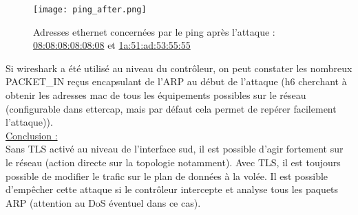\begin{figure}[h]
  	\centering
  	\texttt{[image: ping\_after.png]}
  	\caption{Adresses ethernet concernées par le ping après l'attaque : \url{08:08:08:08:08:08} et \url{1a:51:ad:53:55:55}}
\end{figure}

Si wireshark a été utilisé au niveau du contrôleur, on peut constater les nombreux PACKET\_IN reçus encapsulant de l'ARP au début de l'attaque (h6 cherchant à obtenir les adresses mac de tous les équipements possibles sur le réseau (configurable dans ettercap, mais par défaut cela permet de repérer facilement l'attaque)).\\

\underline{Conclusion :}\\
Sans TLS activé au niveau de l'interface sud, il est possible d'agir fortement sur le réseau (action directe sur la topologie notamment). Avec TLS, il est toujours possible de modifier le trafic sur le plan de données à la volée. Il est possible d'empêcher cette attaque si le contrôleur intercepte et analyse tous les paquets ARP (attention au DoS éventuel dans ce cas).